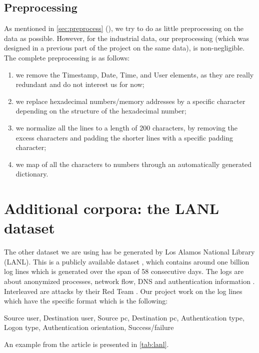 \subsection{Preprocessing}
As mentioned in \autoref{sec:preprocess} (), we try to do as little preprocessing on the data as possible. However, for the industrial data, our preprocessing (which was designed in a previous part of the project on the same data), is non-negligible.
\newpage
The complete preprocessing is as follows:
\begin{enumerate}
	\item we remove the Timestamp, Date, Time, and User elements, as they are really redundant and do not interest us for now;
	\item we replace hexadecimal numbers/memory addresses by a specific character depending on the structure of the hexadecimal number;
	\item we normalize all the lines to a length of 200 characters, by removing the excess characters and padding the shorter lines with a specific padding character;
	\item we map of all the characters to numbers through an automatically generated dictionary.
\end{enumerate}

\section{Additional corpora: the LANL dataset}
The other dataset we are using has be generated by Los Alamos National Library (LANL). This is a publicly available dataset \cite{lanl_source}, which contains around one billion log lines which is generated over the span of 58 consecutive days. The logs are about anonymized processes, network flow, DNS and authentication information \cite{rnn_attention_lanl}. Interleaved are attacks by their Red Team \cite{rnn_attention_lanl}.
Our project work on the log lines which have the specific format which is the following:

\begin{center}
Source user, Destination user, Source pc, Destination pc, Authentication type, Logon type, Authentication orientation, Success/failure
\end{center}

An example from the article \cite{rnn_attention_lanl} is presented in \autoref{tab:lanl}.

